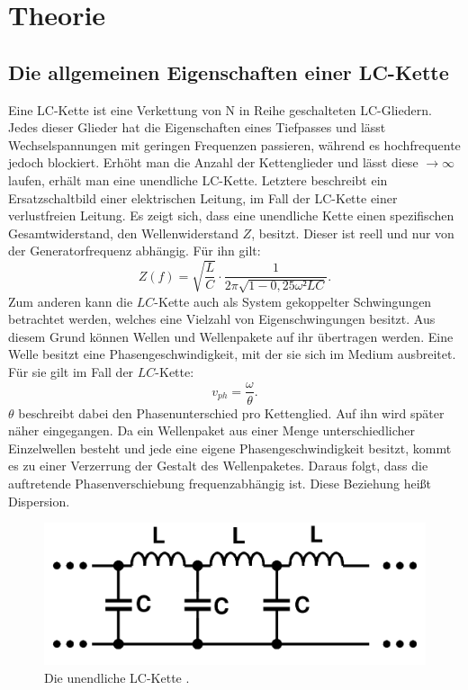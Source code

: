 
\section{Theorie}
\label{sec:Theorie}

\subsection{Die allgemeinen Eigenschaften einer LC-Kette}
Eine LC-Kette ist eine Verkettung von N in Reihe geschalteten LC-Gliedern.
 Jedes dieser Glieder hat die Eigenschaften eines Tiefpasses und lässt
  Wechselspannungen mit geringen Frequenzen passieren, während es hochfrequente jedoch
   blockiert. Erhöht man die Anzahl der Kettenglieder und lässt
   diese $\to \infty$ laufen, erhält man eine unendliche LC-Kette. Letztere
    beschreibt ein Ersatzschaltbild einer elektrischen Leitung, im Fall der
     LC-Kette einer verlustfreien Leitung. Es zeigt sich, dass eine unendliche
      Kette einen spezifischen Gesamtwiderstand, den Wellenwiderstand $Z$, besitzt.
      Dieser ist reell und nur von der Generatorfrequenz abhängig. Für ihn gilt:
      \begin{equation}
        Z(f) = \sqrt{\frac{L}{C}} \cdot \frac{1}{2\pi \sqrt{1-0,25\omega² LC}}\text{.}
      \end{equation}
 Zum anderen kann die $LC$-Kette auch als System gekoppelter
    Schwingungen betrachtet werden, welches eine Vielzahl von Eigenschwingungen besitzt.
      Aus diesem Grund können Wellen und Wellenpakete auf ihr übertragen werden.
	Eine Welle besitzt eine Phasengeschwindigkeit, mit der sie sich im Medium ausbreitet. Für sie gilt im Fall der $LC$-Kette:
\begin{equation}
v_{ph} = \frac{\omega}{\theta}\text{.}
\end{equation}
	$\theta$ beschreibt dabei den Phasenunterschied pro Kettenglied. Auf ihn wird später näher eingegangen.
     Da ein Wellenpaket aus einer Menge unterschiedlicher Einzelwellen besteht
      und jede eine eigene Phasengeschwindigkeit besitzt, kommt es zu einer Verzerrung
  der Gestalt des Wellenpaketes. Daraus folgt, dass die auftretende Phasenverschiebung frequenzabhängig ist.
   Diese Beziehung heißt Dispersion.
     \begin{figure}[H]
       \centering
       \includegraphics[width=\linewidth-200pt,height=\textheight-200pt,keepaspectratio]{content/Grafiken/LCKette.png}
       \caption{Die unendliche LC-Kette \cite{V356}.}
       \label{fig:LC-Kette}
     \end{figure}

